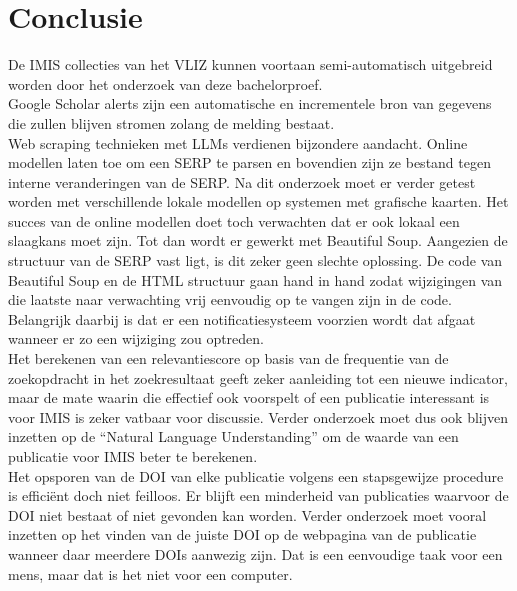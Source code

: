 
\chapter{Conclusie}%
\label{ch:conclusie}

De IMIS collecties van het VLIZ kunnen voortaan semi-automatisch uitgebreid worden door het onderzoek van deze bachelorproef.\\
Google Scholar alerts zijn een automatische en incrementele bron van gegevens die zullen blijven stromen zolang de melding bestaat.\\ 
Web scraping technieken met LLMs verdienen bijzondere aandacht. Online modellen laten toe om een SERP te parsen en bovendien zijn ze bestand tegen interne veranderingen van de SERP. Na dit onderzoek moet er verder getest worden met verschillende lokale modellen op systemen met grafische kaarten. Het succes van de online modellen doet toch verwachten dat er ook lokaal een slaagkans moet zijn. Tot dan wordt er gewerkt met Beautiful Soup. Aangezien de structuur van de SERP vast ligt, is dit zeker geen slechte oplossing. De code van Beautiful Soup en de HTML structuur gaan hand in hand zodat wijzigingen van die laatste naar verwachting vrij eenvoudig op te vangen zijn in de code. Belangrijk daarbij is dat er een notificatiesysteem voorzien wordt dat afgaat wanneer er zo een wijziging zou optreden.\\
Het berekenen van een relevantiescore op basis van de frequentie van de zoekopdracht in het zoekresultaat geeft zeker aanleiding tot een nieuwe indicator, maar de mate waarin die effectief ook voorspelt of een publicatie interessant is voor IMIS is zeker vatbaar voor discussie. Verder onderzoek moet dus ook blijven inzetten op de ``Natural Language Understanding'' om de waarde van een publicatie voor IMIS beter te berekenen.\\
Het opsporen van de DOI van elke publicatie volgens een stapsgewijze procedure is efficiënt doch niet feilloos. Er blijft een minderheid van publicaties waarvoor de DOI niet bestaat of niet gevonden kan worden. Verder onderzoek moet vooral inzetten op het vinden van de juiste DOI op de webpagina van de publicatie wanneer daar meerdere DOIs aanwezig zijn. Dat is een eenvoudige taak voor een mens, maar dat is het niet voor een computer.\\
